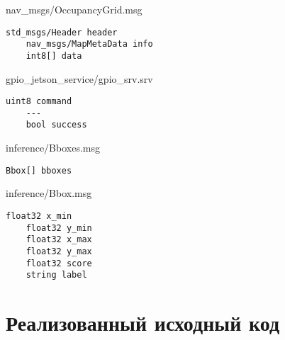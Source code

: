 \begin{ListingEnv}[!h]%
    \captiondelim{ } %
    \caption{nav\_msgs/OccupancyGrid.msg}\label{lst:occupancy-grid-msg}
    \begin{lstlisting}[language={[ISO]C++}]
	std_msgs/Header header
	nav_msgs/MapMetaData info
	int8[] data
    \end{lstlisting}
\end{ListingEnv}%

\begin{ListingEnv}[!h]%
    \captiondelim{ } %
    \caption{gpio\_jetson\_service/gpio\_srv.srv}\label{lst:gpio-srv}
    \begin{lstlisting}[language={[ISO]C++}]
	uint8 command
	---
	bool success
    \end{lstlisting}
\end{ListingEnv}%

\begin{ListingEnv}[!h]%
    \captiondelim{ } %
    \caption{inference/Bboxes.msg}\label{lst:bboxes-msg}
    \begin{lstlisting}[language={[ISO]C++}]
	Bbox[] bboxes
    \end{lstlisting}
\end{ListingEnv}%

\begin{ListingEnv}[!h]%
    \captiondelim{ } %
    \caption{inference/Bbox.msg}\label{lst:bbox-msg}
    \begin{lstlisting}[language={[ISO]C++}]
	float32 x_min
	float32 y_min
	float32 x_max
	float32 y_max
	float32 score
	string label
    \end{lstlisting}
\end{ListingEnv}%

\chapter{Реализованный исходный код}

